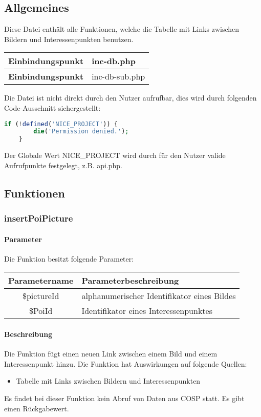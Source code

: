\subsection{Allgemeines} Diese Datei enthält alle Funktionen, welche die Tabelle mit Links zwischen Bildern und Interessenpunkten benutzen.
\begin{table}[H]
	\begin{tabular}{|c|p{11cm}|}
		\hline
		\textbf{Einbindungspunkt} & inc-db.php \\ \hline
		\textbf{Einbindungspunkt} & inc-db-sub.php \\ \hline
	\end{tabular}
\end{table}
Die Datei ist nicht direkt durch den Nutzer aufrufbar, dies wird durch folgenden Code-Ausschnitt sichergestellt:
\begin{lstlisting}[language=php]
	if (!defined('NICE_PROJECT')) {
		die('Permission denied.');
	}
\end{lstlisting}
Der Globale Wert {\glqq NICE\_PROJECT\grqq} wird durch für den Nutzer valide Aufrufpunkte festgelegt, z.B. {\glqq api.php\grqq}.
\newpage
\subsection{Funktionen}
\subsubsection{insertPoiPicture}
\paragraph{Parameter} Die Funktion besitzt folgende Parameter:
\begin{table}[H]
	\begin{tabular}{|c|p{11cm}|}
		\hline
		\textbf{Parametername} & \textbf{Parameterbeschreibung} \\ \hline
		\$pictureId & alphanumerischer Identifikator eines Bildes \\ \hline
		\$PoiId     & Identifikator eines Interessenpunktes \\ \hline
	\end{tabular}
\end{table}
\paragraph{Beschreibung} Die Funktion fügt einen neuen Link zwischen einem Bild und einem Interessenpunkt hinzu. Die Funktion hat Auswirkungen auf folgende Quellen:
\begin{itemize}
	\item Tabelle mit Links zwischen Bildern und Interessenpunkten
\end{itemize}
Es findet bei dieser Funktion kein Abruf von Daten aus {\glqq COSP\grqq} statt. Es gibt einen Rückgabewert.
